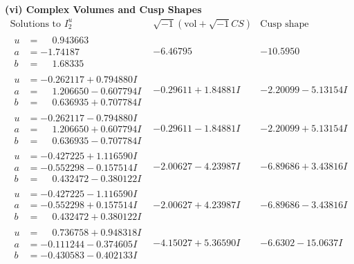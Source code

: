 \documentclass[1p]{elsarticle_modified}
\theoremstyle{definition}
\newcommand{\I}{\sqrt{-1}}
\begin{document}
\newpage\flushleft \textbf{(vi) Complex Volumes and Cusp Shapes}
$$\begin{array}{c|c|c}  
\text{Solutions to }I^u_{2}& \I (\text{vol} + \sqrt{-1}CS) & \text{Cusp shape}\\
 \hline 
\begin{aligned}
u &= \phantom{-}0.943663\phantom{ +0.000000I} \\
a &= -1.74187\phantom{ +0.000000I} \\
b &= \phantom{-}1.68335\phantom{ +0.000000I}\end{aligned}
 & -6.46795\phantom{ +0.000000I} & -10.5950\phantom{ +0.000000I} \\ \hline\begin{aligned}
u &= -0.262117 + 0.794880 I \\
a &= \phantom{-}1.206650 - 0.607794 I \\
b &= \phantom{-}0.636935 + 0.707784 I\end{aligned}
 & -0.29611 + 1.84881 I & -2.20099 - 5.13154 I \\ \hline\begin{aligned}
u &= -0.262117 - 0.794880 I \\
a &= \phantom{-}1.206650 + 0.607794 I \\
b &= \phantom{-}0.636935 - 0.707784 I\end{aligned}
 & -0.29611 - 1.84881 I & -2.20099 + 5.13154 I \\ \hline\begin{aligned}
u &= -0.427225 + 1.116590 I \\
a &= -0.552298 - 0.157514 I \\
b &= \phantom{-}0.432472 - 0.380122 I\end{aligned}
 & -2.00627 - 4.23987 I & -6.89686 + 3.43816 I \\ \hline\begin{aligned}
u &= -0.427225 - 1.116590 I \\
a &= -0.552298 + 0.157514 I \\
b &= \phantom{-}0.432472 + 0.380122 I\end{aligned}
 & -2.00627 + 4.23987 I & -6.89686 - 3.43816 I \\ \hline\begin{aligned}
u &= \phantom{-}0.736758 + 0.948318 I \\
a &= -0.111244 - 0.374605 I \\
b &= -0.430583 - 0.402133 I\end{aligned}
 & -4.15027 + 5.36590 I & -6.6302 - 15.0637 I \\ \hline\begin{aligned}

\end{aligned}
\end{array}$$
\end{document}
